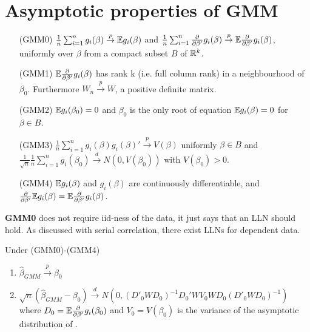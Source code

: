 \documentclass[DIV=14,titlepage=false]{scrreprt}
\begin{document}
\section{Asymptotic properties of GMM}
\begin{itemize}
    \item [(GMM0)]  $\frac{1}{n}\sum_{i=1}^{n}g_i(\beta)\overset{p}{\to} \mathbb{E} g_i(\beta)$ and $\frac{1}{n}\sum_{i=1}^{n} \frac{\partial}{\partial \beta'}g_i(\beta)\overset{p}{\to} \mathbb{E} \frac{\partial}{\partial \beta'} g_i(\beta)$, uniformly over $\beta$ from a compact subset $B$ of $\mathbb{R}^k$.
    \item [(GMM1)] $\mathbb{E} \frac{\partial}{\partial \beta'} g_i(\beta)$ has rank k (i.e. full column rank) in a neighbourhood of $\beta_0$. Furthermore $W_n \overset{p}{\to} W$, a positive definite matrix.
    \item [(GMM2)] $\mathbb{E} g_i(\beta_0)=0$ and $\beta_0$ is the only root of equation $\mathbb{E} g_i(\beta)=0$ for $\beta \in B$.
    \item [(GMM3)] $\frac{1}{n}\sum_{i=1}^{n}g_i(\beta)g_i(\beta)' \overset{p}{\to} V(\beta)$ uniformly  $\beta \in B$ and $\frac{1}{\sqrt{n}}\frac{1}{n}\sum_{i=1}^{n}g_i(\beta_0) \overset{d}{\to}N(0,V(\beta_0))$ with $V(\beta_0)>0$.
    \item [(GMM4)] $\mathbb{E} g_i(\beta)$ and $g_i(\beta)$ are continuously differentiable, and $\frac{\partial}{\partial \beta'} \mathbb{E} g_i(\beta) = \mathbb{E} \frac{\partial}{\partial \beta'}g_i(\beta)$.
\end{itemize}
\textbf{GMM0} does not require iid-ness of the data, it just says that an LLN should hold. As discussed with serial correlation, there exist LLNs for dependent data.
\begin{theorem}
    Under (GMM0)-(GMM4)
    \begin{enumerate}
        \item $\hat\beta_{GMM} \overset{p}{\to} \beta_0$
        \item $\sqrt{n}(\hat\beta_{GMM}-\beta_0) \overset{d}{\to} N(0,(D'_0WD_0)^{-1}D_0'WV_0WD_0(D'_0WD_0)^{-1})$ where $D_0=\mathbb{E} \frac{\partial}{\partial \beta'}g_i(\beta_0)$ and $V_0=V(\beta_0)$ is the variance of the asymptotic distribution of .
    \end{enumerate}
\end{theorem}
\end{document}
